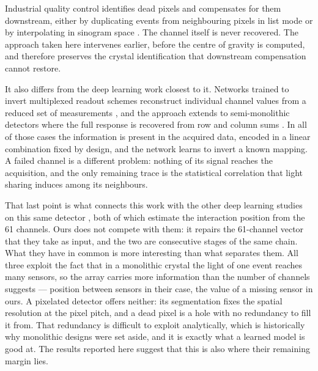 \documentclass[10pt,conference]{IEEEtran}
\begin{document}
Industrial quality control identifies dead pixels and compensates for them
downstream, either by duplicating events from neighbouring pixels in list mode
or by interpolating in sinogram space \cite{philips2015deadpixel}. The channel
itself is never recovered. The approach taken here intervenes earlier, before
the centre of gravity is computed, and therefore preserves the crystal
identification that downstream compensation cannot restore.

It also differs from the deep learning work closest to it. Networks trained to
invert multiplexed readout schemes reconstruct individual channel values from a
reduced set of measurements \cite{li2023, niu_cnn-based_2024}, and the approach
extends to semi-monolithic detectors where the full response is recovered from
row and column sums \cite{loignon-houle_multi-input_2026}. In all of those
cases the information is present in the acquired data, encoded in a linear
combination fixed by design, and the network learns to invert a known mapping.
A failed channel is a different problem: nothing of its signal reaches the
acquisition, and the only remaining trace is the statistical correlation that
light sharing induces among its neighbours.

That last point is what connects this work with the other deep learning studies
on this same detector \cite{jimenez2025, hidalgo-torres_predicting_2020}, both
of which estimate the interaction position from the 61 channels. Ours does not
compete with them: it repairs the 61-channel vector that they take as input, and
the two are consecutive stages of the same chain. What they have in common is more
interesting than what separates them. All three exploit the fact that in a
monolithic crystal the light of one event reaches many sensors, so the array
carries more information than the number of channels suggests --- position
between sensors in their case, the value of a missing sensor in ours. A
pixelated detector offers neither: its segmentation fixes the spatial
resolution at the pixel pitch, and a dead pixel is a hole with no redundancy to
fill it from. That redundancy is difficult to exploit analytically, which is
historically why monolithic designs were set aside, and it is exactly what a
learned model is good at. The results reported here suggest that this is also
where their remaining margin lies.
\end{document}
